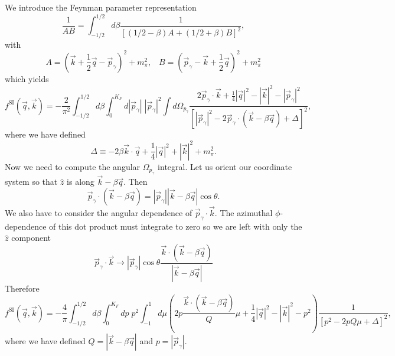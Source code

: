 \documentclass{book}[letterpaper,12pt]
\begin{document}
We introduce the Feynman parameter representation
\begin{equation}
\frac{1}{AB}=\int_{-1/2}^{1/2}d\beta \frac{1}{\left[(1/2-\beta)A+(1/2+\beta)B\right]^2},
\end{equation}
with 
\begin{equation}
A=\left(\vec{k}+\frac{1}{2}\vec{q}-\vec{p}_{\gamma}\right)^2+m_{\pi}^2,\;\;\;B=\left(\vec{p}_{\gamma}-\vec{k}+\frac{1}{2}\vec{q}\right)^2+m_{\pi}^2
\end{equation}
which yields
\begin{equation}
f^\mathrm{SI}(\vec{q},\vec{k})=-\frac{2}{\pi^2}\int_{-1/2}^{1/2}d\beta \int_0^{K_F}d|\vec{p}_{\gamma}|\;|\vec{p}_{\gamma}|^2\int d\Omega_{p_{\gamma}}\frac{2\vec{p}_{\gamma}\cdot\vec{k}+\frac{1}{4}|\vec{q}|^2-|\vec{k}|^2-|\vec{p}_{\gamma}|^2}{\left[|\vec{p}_{\gamma}|^2-2\vec{p}_{\gamma}\cdot\left(\vec{k}-\beta\vec{q}\right)+\Delta\right]^2},
\end{equation}
where we have defined
\begin{equation}
\Delta\equiv -2\beta\vec{k}\cdot\vec{q}+\frac{1}{4}|\vec{q}|^2+|\vec{k}|^2+m_{\pi}^2.
\end{equation}
Now we need to compute the angular $\Omega_{p_{\gamma}}$ integral. Let us orient our coordinate system so that $\hat{z}$ is along $\vec{k}-\beta\vec{q}$. Then
\begin{equation}
\vec{p}_{\gamma}\cdot \left(\vec{k}-\beta\vec{q}\right)=|\vec{p}_{\gamma}||\vec{k}-\beta\vec{q}|\cos\theta.
\end{equation}
We also have to consider the angular dependence of $\vec{p}_{\gamma}\cdot\vec{k}$. The azimuthal $\phi$-dependence of this dot product must integrate to zero so we are left with only the $\hat{z}$ component
\begin{equation}
\vec{p}_{\gamma}\cdot \vec{k}\rightarrow |\vec{p}_{\gamma}|\cos\theta \frac{\vec{k}\cdot(\vec{k}-\beta\vec{q})}{|\vec{k}-\beta\vec{q}|}
\end{equation}
Therefore
\begin{equation}
f^\mathrm{SI}(\vec{q},\vec{k})=-\frac{4}{\pi}\int_{-1/2}^{1/2}d\beta \int_0^{K_F}dp\;p^2 \int_{-1}^1d\mu \left(2p\frac{\vec{k}\cdot\left(\vec{k}-\beta\vec{q}\right)}{Q}\mu+\frac{1}{4}|\vec{q}|^2-|\vec{k}|^2-p^2\right)\frac{1}{\left[p^2-2pQ\mu+\Delta\right]^2},
\end{equation}
where we have defined $Q=|\vec{k}-\beta\vec{q}|$ and $p=|\vec{p}_\gamma|$.
\end{document}

